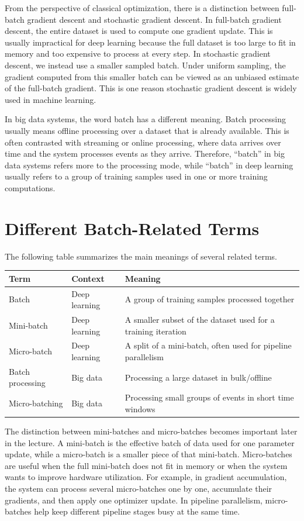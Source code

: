 From the perspective of classical optimization, there is a distinction between full-batch gradient descent and stochastic gradient descent. In full-batch gradient descent, the entire dataset is used to compute one gradient update. This is usually impractical for deep learning because the full dataset is too large to fit in memory and too expensive to process at every step. In stochastic gradient descent, we instead use a smaller sampled batch. Under uniform sampling, the gradient computed from this smaller batch can be viewed as an unbiased estimate of the full-batch gradient. This is one reason stochastic gradient descent is widely used in machine learning.

In big data systems, the word batch has a different meaning. Batch processing usually means offline processing over a dataset that is already available. This is often contrasted with streaming or online processing, where data arrives over time and the system processes events as they arrive. Therefore, ``batch'' in big data systems refers more to the processing mode, while ``batch'' in deep learning usually refers to a group of training samples used in one or more training computations.

\section{Different Batch-Related Terms}

The following table summarizes the main meanings of several related terms.

\begin{center}
\begin{tabular}{lll}
\toprule
\textbf{Term} & \textbf{Context} & \textbf{Meaning} \\
\midrule
Batch & Deep learning & A group of training samples processed together \\
Mini-batch & Deep learning & A smaller subset of the dataset used for a training iteration \\
Micro-batch & Deep learning & A split of a mini-batch, often used for pipeline parallelism \\
Batch processing & Big data & Processing a large dataset in bulk/offline \\
Micro-batching & Big data & Processing small groups of events in short time windows \\
\bottomrule
\end{tabular}
\end{center}

The distinction between mini-batches and micro-batches becomes important later in the lecture. A mini-batch is the effective batch of data used for one parameter update, while a micro-batch is a smaller piece of that mini-batch. Micro-batches are useful when the full mini-batch does not fit in memory or when the system wants to improve hardware utilization. For example, in gradient accumulation, the system can process several micro-batches one by one, accumulate their gradients, and then apply one optimizer update. In pipeline parallelism, micro-batches help keep different pipeline stages busy at the same time.
